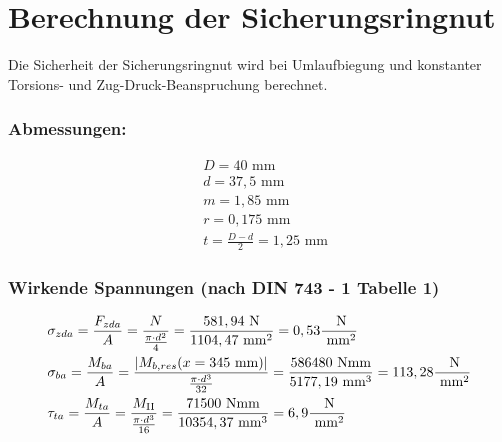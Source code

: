 \section{Berechnung der Sicherungsringnut}
Die Sicherheit der Sicherungsringnut wird bei Umlaufbiegung und konstanter Torsions- und Zug-Druck-Beanspruchung berechnet.
\subsubsection{Abmessungen:}
\begin{align*}
&D= 40 \text{ mm}  \\
&d= 37,5 \text{ mm}  \\
& m= 1,85 \text{ mm} \\
& r= 0,175 \text{ mm}\\
& t=\frac{D-d}{2} =1,25 \text{ mm} 
\end{align*}
\subsubsection{Wirkende Spannungen (nach DIN 743 - 1 Tabelle 1)}
\begin{align*}
&\sigma_{zda} = \frac{F_{zda}}{A} = \frac{N}{\frac{\pi \cdot d^2}{4}} = \frac{581,94 \text{ N}}{1104,47 \text{ mm}^2} = 0,53 \frac{\text{ N}}{\text{ mm}^2} \\
&\sigma_{ba} = \frac{M_{ba}}{A} = \frac{|M_{b,res}(x=345 \text{ mm}) |}{\frac{\pi \cdot d^3}{32}} = \frac{586480 \text{ Nmm}}{5177,19 \text{ mm}^3} = 113,28 \frac{\text{ N}}{\text{ mm}^2} \\
&\tau_{ta} = \frac{M_{ta}}{A} = \frac{M_{\mathrm{II}}}{\frac{\pi \cdot d^3}{16}} = \frac{71500 \text{ Nmm}}{10354,37 \text{ mm}^3} = 6,9 \frac{\text{ N}}{\text{ mm}^2} 
\end{align*}

